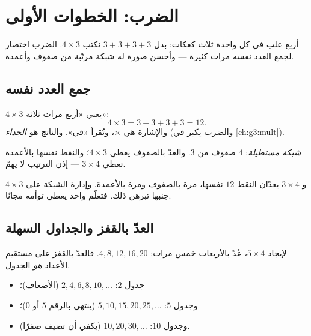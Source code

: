 \chapter{الضرب: الخطوات الأولى}\label{ch:g2:mult}

أربع علب في كل واحدة ثلاث كعكات: بدل $3 + 3 + 3 + 3$ نكتب
$4 \times 3$. الضرب اختصار لجمع العدد نفسه مرات كثيرة --- وأحسن
صورة له شبكة مرتّبة من صفوف
وأعمدة.

\section{جمع العدد نفسه}

\begin{definition}[الضرب]\label{def:g2:mult:def}
$4 \times 3$ يعني «أربع مرات ثلاثة»:
\[
4 \times 3 = 3 + 3 + 3 + 3 = 12 .
\]
والإشارة هي $\times$، وتُقرأ «في». والناتج هو
\emph{الجداء} (والضرب يكبر في \cref{ch:g3:mult}).
\end{definition}

\begin{omfigure}

{\small \emph{شبكة مستطيلة}: $4$ صفوف من $3$. والعدّ بالصفوف يعطي
$4 \times 3$؛ والنقط نفسها بالأعمدة تعطي $3 \times 4$ --- إذن
الترتيب لا يهمّ.}
\end{omfigure}

\begin{example}\label{ex:g2:mult:order}
$4 \times 3$ و $3 \times 4$ يعدّان النقط $12$ نفسها، مرة
بالصفوف ومرة بالأعمدة. وإدارة الشبكة على جنبها تبرهن ذلك. فتعلّم
 واحد يعطي توأمه مجانًا.
\end{example}

\section{العدّ بالقفز والجداول السهلة}

\begin{method}\label{met:g2:mult:skip}
لإيجاد $5 \times 4$، عُدّ بالأربعات خمس مرات:
$4, 8, 12, 16, 20$. فالعدّ بالقفز على مستقيم الأعداد
\emph{هو} الجدول.
\begin{itemize}
  \item جدول $2$: $2, 4, 6, 8, 10, \dots$ (الأضعاف)؛
  \item وجدول $5$: $5, 10, 15, 20, 25, \dots$ (ينتهي بالرقم $5$ أو
        $0$)؛
  \item وجدول $10$: $10, 20, 30, \dots$ (يكفي أن تضيف صفرًا).
\end{itemize}
\end{method}

